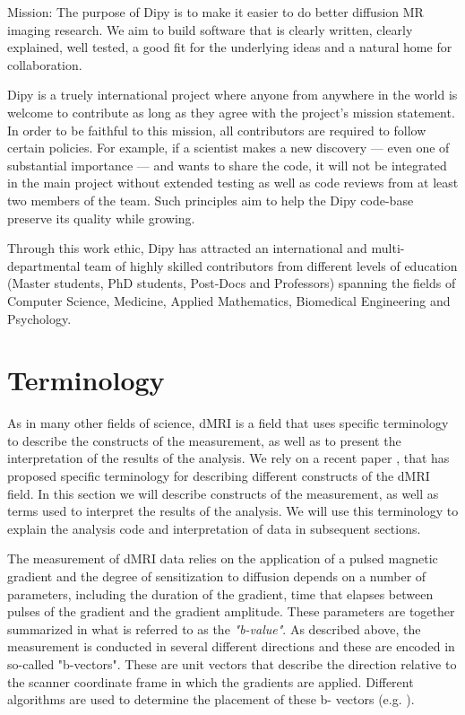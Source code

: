 \documentclass{bioinfo}
\begin{document}
Mission: The purpose of Dipy is to make it easier to do better diffusion MR
imaging research. We aim to build software that is clearly written, clearly
explained, well tested, a good fit for the underlying ideas and a natural home
for collaboration.

Dipy is a truely international project where anyone from anywhere in the world
is welcome to contribute as long as they agree with the project's mission
statement. In order to be faithful to this mission, all contributors are
required to follow certain policies. For example, if a scientist makes a new
discovery --- even one of substantial importance --- and wants to share the code,
it will not be integrated in the main project without extended testing as well
as code reviews from at least two members of the team.  Such principles
aim to help the Dipy code-base preserve its quality while growing.

Through this work ethic, Dipy has attracted an international and
multi-departmental team of highly skilled contributors from different levels
of education (Master students, PhD students, Post-Docs and Professors)
spanning the fields of Computer Science, Medicine, Applied Mathematics,
Biomedical Engineering and Psychology.


\section{Terminology}

As in many other fields of science, dMRI is a field that uses specific
terminology to describe the constructs of the measurement, as well as to
present the interpretation of the results of the analysis. We rely on a recent
paper \citep{Cote2013tractometer}, that has proposed specific terminology for
describing different constructs of the dMRI field. In this section we will
describe constructs of the measurement, as well as terms used to interpret
the results of the analysis. We will use this terminology to explain the
analysis code and interpretation of data in subsequent sections.

The measurement of dMRI data relies on the application of a pulsed magnetic
gradient and the degree of sensitization to diffusion depends on a number of
parameters, including the duration of the gradient, time that elapses between
pulses of the gradient and the gradient amplitude. These parameters are
together summarized in what is referred to as the \emph{"b-value"}.  As described
above, the measurement is conducted in several different directions and these
are encoded in so-called "b-vectors". These are unit vectors that describe the
direction relative to the scanner coordinate frame in which the gradients are
applied. Different algorithms are used to determine the placement of these b-
vectors (e.g. \citep{jones-etal:99}).
\end{document}
